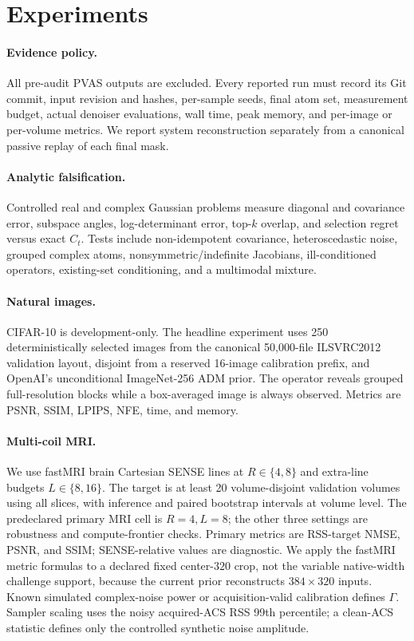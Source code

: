 \section{Experiments}
\label{sec:experiments}

\paragraph{Evidence policy.}
All pre-audit PVAS outputs are excluded.  Every reported run must record its
Git commit, input revision and hashes, per-sample seeds, final atom set,
measurement budget, actual denoiser evaluations, wall time, peak memory, and
per-image or per-volume metrics.  We report system reconstruction separately
from a canonical passive replay of each final mask.

\paragraph{Analytic falsification.}
Controlled real and complex Gaussian problems measure diagonal and covariance
error, subspace angles, log-determinant error, top-$k$ overlap, and selection
regret versus exact $C_t$.  Tests include non-idempotent covariance,
heteroscedastic noise, grouped complex atoms, nonsymmetric/indefinite
Jacobians, ill-conditioned operators, existing-set conditioning, and a
multimodal mixture.

\paragraph{Natural images.}
CIFAR-10 is development-only.  The headline experiment uses 250
deterministically selected images from the canonical 50,000-file ILSVRC2012
validation layout, disjoint from a reserved 16-image calibration prefix, and
OpenAI's unconditional ImageNet-256 ADM prior.  The
operator reveals grouped full-resolution blocks while a box-averaged image is
always observed.  Metrics are PSNR, SSIM, LPIPS, NFE, time, and memory.

\paragraph{Multi-coil MRI.}
We use fastMRI brain Cartesian SENSE lines at $R\in\{4,8\}$ and extra-line
budgets $L\in\{8,16\}$.  The target is at least 20 volume-disjoint validation
volumes using all slices, with inference and paired bootstrap intervals at volume level.
The predeclared primary MRI cell is $R=4,L=8$; the other three settings are
robustness and compute-frontier checks.
Primary metrics are RSS-target NMSE, PSNR, and SSIM; SENSE-relative values
are diagnostic.  We apply the fastMRI metric formulas to a declared fixed
center-$320$ crop, not the variable native-width challenge support, because
the current prior reconstructs $384\times320$ inputs.  Known simulated
complex-noise power or acquisition-valid calibration defines $\Gamma$.
Sampler scaling uses the noisy acquired-ACS RSS 99th percentile; a clean-ACS
statistic defines only the controlled synthetic noise amplitude.

